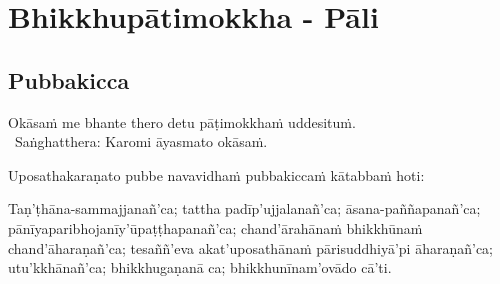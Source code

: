 

\chapter{Bhikkhupātimokkha - Pāli}

\clearpage



\section{Pubbakicca}
\label{pubbakicca}

\begin{intro}
	Okāsaṁ me bhante thero detu pāṭimokkhaṁ uddesituṁ.\makeatletter\hyperlink{endnote13-appendix}\makeatother\\
	\anglebracketleft\ \hspace{-0.5mm}Saṅghatthera: Karomi āyasmato okāsaṁ. \hspace{-0.5mm}\anglebracketright\
\end{intro}

Uposathakaraṇato pubbe navavidhaṁ pubbakiccaṁ kātabbaṁ hoti:

Taṇ'ṭhāna-sammajjanañ'ca; tattha padīp'ujjalanañ'ca; āsana-paññapanañ'ca; pānīyaparibhojanīy'ūpaṭṭhapanañ'ca; chand'ārahānaṁ bhikkhūnaṁ chand'āharaṇañ'ca; tesaññ'eva akat'uposathānaṁ pārisuddhiyā'pi āharaṇañ'ca; utu'kkhānañ'ca; bhikkhugaṇanā ca; bhikkhunīnam'ovādo cā'ti.

